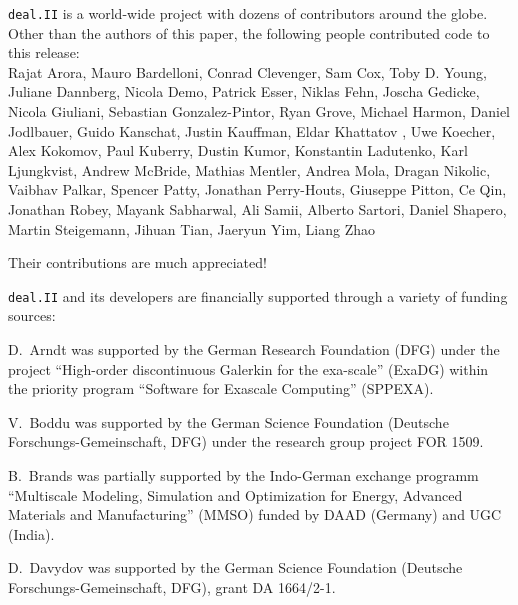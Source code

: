\documentclass{ansarticle-preprint}
\newcommand{\specialword}[1]{\texttt{#1}}
\newcommand{\dealii}{{\specialword{deal.II}}}
\begin{document}
\dealii{} is a world-wide project with dozens of contributors around the
globe. Other than the authors of this paper, the following people contributed code to
this release:\\
%
%
  Rajat Arora,
  Mauro Bardelloni,
  Conrad Clevenger,
  Sam Cox,
  Toby D. Young,
  Juliane Dannberg,
  Nicola Demo,
  Patrick Esser,
  Niklas Fehn,
  Joscha Gedicke,
  Nicola Giuliani,
  Sebastian Gonzalez-Pintor,
  Ryan Grove,
  Michael Harmon,
  Daniel Jodlbauer,
  Guido Kanschat,
  Justin Kauffman,
  Eldar Khattatov ,
  Uwe Koecher,
  Alex Kokomov,
  Paul Kuberry,
  Dustin Kumor,
  Konstantin Ladutenko,
  Karl Ljungkvist,
  Andrew McBride,
  Mathias Mentler,
  Andrea Mola,
  Dragan Nikolic,
  Vaibhav Palkar,
  Spencer Patty,
  Jonathan Perry-Houts,
  Giuseppe Pitton,
  Ce Qin,
  Jonathan Robey,
  Mayank Sabharwal,
  Ali Samii,
  Alberto Sartori,
  Daniel Shapero,
  Martin Steigemann,
  Jihuan Tian,
  Jaeryun Yim,
  Liang Zhao


Their contributions are much appreciated!


\bigskip

\dealii{} and its developers are financially supported through a
variety of funding sources:

D.~Arndt was supported by the German Research Foundation (DFG) under the
project ``High-order discontinuous Galerkin for the exa-scale'' (ExaDG) within the
priority program ``Software for Exascale Computing'' (SPPEXA).

%
V.~Boddu was supported by the German Science Foundation (Deutsche 
Forschungs-Gemeinschaft, DFG) under the research group project FOR 1509.

B.~Brands was partially supported by the Indo-German exchange programm ``Multiscale Modeling, Simulation and Optimization for Energy, Advanced Materials and Manufacturing'' (MMSO) funded by DAAD (Germany) and UGC (India).

D.~Davydov was supported by the German Science Foundation
(Deutsche Forschungs-Gemeinschaft, DFG), grant DA 1664/2-1.
\end{document}
